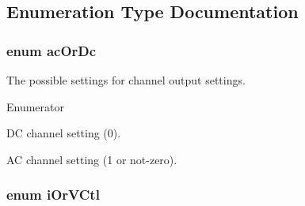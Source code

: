 \subsection{Enumeration Type Documentation}
\hypertarget{a00021_a067edf486f2115dfa74e51ce43cfdfa6}{
\subsubsection[{ac\-Or\-Dc}]{\setlength{\rightskip}{0pt plus 5cm}enum {\bf ac\-Or\-Dc}}}\label{a00021_a067edf486f2115dfa74e51ce43cfdfa6}
The possible settings for channel output settings. \begin{Desc}
\item[Enumerator]\par
\begin{description}
\item[{\em 
\hypertarget{a00021_a067edf486f2115dfa74e51ce43cfdfa6a22e2e72997ac4289587cadae38cc561e}{dc}\label{a00021_a067edf486f2115dfa74e51ce43cfdfa6a22e2e72997ac4289587cadae38cc561e}
}]D\-C channel setting (0). \item[{\em 
\hypertarget{a00021_a067edf486f2115dfa74e51ce43cfdfa6ae13614f9b874b4bbeb45317b280ae5f0}{ac}\label{a00021_a067edf486f2115dfa74e51ce43cfdfa6ae13614f9b874b4bbeb45317b280ae5f0}
}]A\-C channel setting (1 or not-\/zero). \end{description}
\end{Desc}
\hypertarget{a00021_a717a050513c9f1668fa40e08c4d5e78f}{
\subsubsection[{i\-Or\-V\-Ctl}]{\setlength{\rightskip}{0pt plus 5cm}enum {\bf i\-Or\-V\-Ctl}}}\label{a00021_a717a050513c9f1668fa40e08c4d5e78f}
